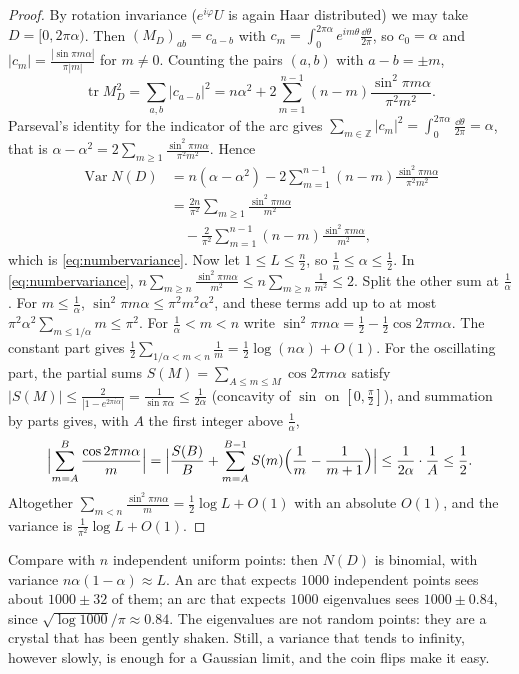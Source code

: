 \begin{proof}
By rotation invariance ($e^{i\varphi}U$ is again Haar distributed) we may take $D=[0,2\pi\alpha)$. Then $(M_D)_{ab}=c_{a-b}$ with $c_m=\int_0^{2\pi\alpha}e^{im\theta}\frac{\dd\theta}{2\pi}$, so $c_0=\alpha$ and $|c_m|=\frac{|\sin\pi m\alpha|}{\pi|m|}$ for $m\ne0$. Counting the
pairs $(a,b)$ with $a-b=\pm m$,
\[
\operatorname{tr}M_D^2=\sum_{a,b}|c_{a-b}|^2=n\alpha^2+2\sum_{m=1}^{n-1}(n-m)\frac{\sin^2\pi m\alpha}{\pi^2m^2}.
\]
Parseval's identity for the indicator of the arc gives $\sum_{m\in\mathbb Z}|c_m|^2=\int_0^{2\pi\alpha}\frac{\dd\theta}{2\pi}=\alpha$, that is $\alpha-\alpha^2=2\sum_{m\ge1}\frac{\sin^2\pi m\alpha}{\pi^2m^2}$. Hence
\begin{align*}
\operatorname{Var}N(D)&=n(\alpha-\alpha^2)-2\sum_{m=1}^{n-1}(n-m)\frac{\sin^2\pi m\alpha}{\pi^2m^2}\\
&=\frac{2n}{\pi^2}\sum_{m\ge1}\frac{\sin^2\pi m\alpha}{m^2}\\
&\quad-\frac2{\pi^2}\sum_{m=1}^{n-1}(n-m)\frac{\sin^2\pi m\alpha}{m^2},
\end{align*}
which is \eqref{eq:numbervariance}. Now let $1\le L\le\frac n2$, so $\frac1n\le\alpha\le\frac12$. In \eqref{eq:numbervariance}, $n\sum_{m\ge n}\frac{\sin^2\pi m\alpha}{m^2}\le n\sum_{m\ge n}\frac1{m^2}\le2$. Split the other sum at $\frac1\alpha$. For $m\le\frac1\alpha$,
$\sin^2\pi m\alpha\le\pi^2m^2\alpha^2$, and these terms add up to at most $\pi^2\alpha^2\sum_{m\le1/\alpha}m\le\pi^2$. For $\frac1\alpha<m<n$ write $\sin^2\pi m\alpha=\frac12-\frac12\cos2\pi m\alpha$. The constant part gives
$\frac12\sum_{1/\alpha<m<n}\frac1m=\frac12\log(n\alpha)+O(1)$. For the oscillating part, the partial sums $S(M)=\sum_{A\le m\le M}\cos2\pi m\alpha$ satisfy $|S(M)|\le\frac2{|1-e^{2\pi i\alpha}|}=\frac1{\sin\pi\alpha}\le\frac1{2\alpha}$
(concavity of $\sin$ on $[0,\frac\pi2]$), and summation by parts gives, with $A$ the first integer above $\frac1\alpha$,
\[
\Bigl|\sum_{m=A}^{B}\frac{\cos2\pi m\alpha}m\Bigr|=\Bigl|\frac{S(B)}B+\sum_{m=A}^{B-1}S(m)\Bigl(\frac1m-\frac1{m+1}\Bigr)\Bigr|\le\frac1{2\alpha}\cdot\frac1A\le\frac12.
\]
Altogether $\sum_{m<n}\frac{\sin^2\pi m\alpha}m=\frac12\log L+O(1)$ with an absolute $O(1)$, and the variance is $\frac1{\pi^2}\log L+O(1)$.
\end{proof}

Compare with $n$ independent uniform points: then $N(D)$ is binomial, with variance $n\alpha(1-\alpha)\approx L$. An arc that expects $1000$ independent points sees about $1000\pm32$ of them; an arc that expects
$1000$ eigenvalues sees $1000\pm0.84$, since $\sqrt{\log1000}/\pi\approx0.84$. The eigenvalues are not random points: they are a crystal that has been gently shaken. Still, a variance that tends to infinity, however slowly, is
enough for a Gaussian limit, and the coin flips make it easy.

